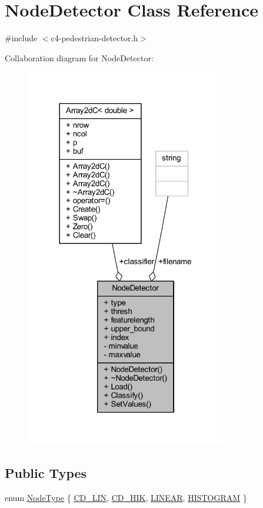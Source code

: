 \hypertarget{class_node_detector}{}\section{Node\+Detector Class Reference}
\label{class_node_detector}


{\ttfamily \#include $<$c4-\/pedestrian-\/detector.\+h$>$}



Collaboration diagram for Node\+Detector\+:\nopagebreak
\begin{figure}[H]
\begin{center}
\leavevmode
\includegraphics[width=249pt]{class_node_detector__coll__graph}
\end{center}
\end{figure}
\subsection*{Public Types}
\begin{DoxyCompactItemize}
\item 
enum \mbox{\hyperlink{class_node_detector_a7188c48dfe6b88b3b7f47c599c4832bd}{Node\+Type}} \{ \mbox{\hyperlink{class_node_detector_a7188c48dfe6b88b3b7f47c599c4832bda0fae40660f7fc68812bec11a7de3413e}{C\+D\+\_\+\+L\+IN}}, 
\mbox{\hyperlink{class_node_detector_a7188c48dfe6b88b3b7f47c599c4832bda65deee8e79173b207da52debff561c83}{C\+D\+\_\+\+H\+IK}}, 
\mbox{\hyperlink{class_node_detector_a7188c48dfe6b88b3b7f47c599c4832bda92a38601f0cada88be925ffd8824effc}{L\+I\+N\+E\+AR}}, 
\mbox{\hyperlink{class_node_detector_a7188c48dfe6b88b3b7f47c599c4832bda4aa354e1c9fdf0c2fa2036b5922ccdf6}{H\+I\+S\+T\+O\+G\+R\+AM}}
 \}
\end{DoxyCompactItemize}
